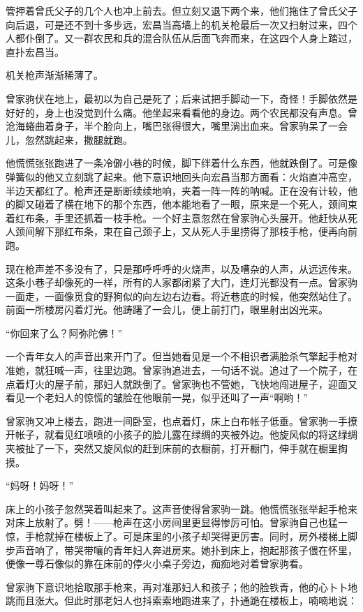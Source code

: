 \par 管押着曾氏父子的几个人也冲上前去。但立刻又退下两个来，他们拖住了曾氏父子向后退，可是还不到十多步远，宏昌当高墙上的机关枪最后一次又扫射过来，四个人都仆倒了。又一群农民和兵的混合队伍从后面飞奔而来，在这四个人身上踏过，直扑宏昌当。
\par 机关枪声渐渐稀薄了。
\par 曾家驹伏在地上，最初以为自己是死了；后来试把手脚动一下，奇怪！手脚依然是好好的，身上也没觉到什么痛。他坐起来看看他的身边。两个农民都没有声息。曾沧海蜷曲着身子，半个脸向上，嘴巴张得很大，嘴里淌出血来。曾家驹呆了一会儿，忽然跳起来，撒腿就跑。
\par 他慌慌张张跑进了一条冷僻小巷的时候，脚下绊着什么东西，他就跌倒了。可是像弹簧似的他又立刻跳了起来。他下意识地回头向宏昌当那方面看：火焰直冲高空，半边天都红了。枪声还是断断续续地响，夹着一阵一阵的呐喊。正在没有计较，他的脚又碰着了横在地下的那个东西，他本能地看了一眼，原来是一个死人，颈间束着红布条，手里还抓着一枝手枪。一个好主意忽然在曾家驹心头展开。他赶快从死人颈间解下那红布条，束在自己颈子上，又从死人手里捞得了那枝手枪，便再向前跑。
\par 现在枪声差不多没有了，只是那呼呼呼的火烧声，以及嘈杂的人声，从远远传来。这条小巷子却像死的一样，所有的人家都闭紧了大门，连灯光都没有一点。曾家驹一面走，一面像觅食的野狗似的向左边右边看。将近巷底的时候，他突然站住了。前面一所楼房闪着灯光。他踌躇了一会儿，便上前打门，眼里射出凶光来。
\par “你回来了么？阿弥陀佛！”
\par 一个青年女人的声音出来开门了。但当她看见是一个不相识者满脸杀气擎起手枪对准她，就狂喊一声，往里边跑。曾家驹追进去，一句话不说。追过了一个院子，在点着灯火的屋子前，那妇人就跌倒了。曾家驹也不管她，飞快地闯进屋子，迎面又看见一个老妇人的惊慌的皱脸在他眼前一晃，似乎还叫了一声“啊哟！”
\par 曾家驹又冲上楼去，跑进一间卧室，也点着灯，床上白布帐子低垂。曾家驹一手撩开帐子，就看见红喷喷的小孩子的脸儿露在绿绸的夹被外边。他旋风似的将这绿绸夹被扯了一下，突然又旋风似的赶到床前的衣橱前，打开橱门，伸手就在橱里掏摸。
\par “妈呀！妈呀！”
\par 床上的小孩子忽然哭着叫起来了。这声音使得曾家驹一跳。他慌慌张张举起手枪来对床上放射了。劈！——枪声在这小房间里更显得惨厉可怕。曾家驹自己也猛一惊，手枪就掉在楼板上了。可是床里的小孩子却哭得更厉害。同时，房外楼梯上脚步声音响了，带哭带嚷的青年妇人奔进房来。她扑到床上，抱起那孩子偎在怀里，便像一尊石像似的靠在床前的停火小桌子旁边，痴痴地对着曾家驹看。
\par 曾家驹下意识地拾取那手枪来，再对准那妇人和孩子；他的脸铁青，他的心卜卜地跳而且涨大。但此时那老妇人也抖索索地跑进来了，扑通跪在楼板上，喃喃地说：
